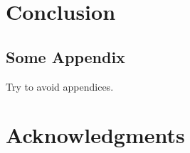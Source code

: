 \documentclass[a4paper,11pt,twoside]{pads-thesis}
\begin{document}
\chapter{Conclusion} \label{chap:conclusion}


 

\begin{appendices}
    \chapter{Some Appendix}
    Try to avoid appendices.
    
\end{appendices}



\chapter*{Acknowledgments}

\end{document}
